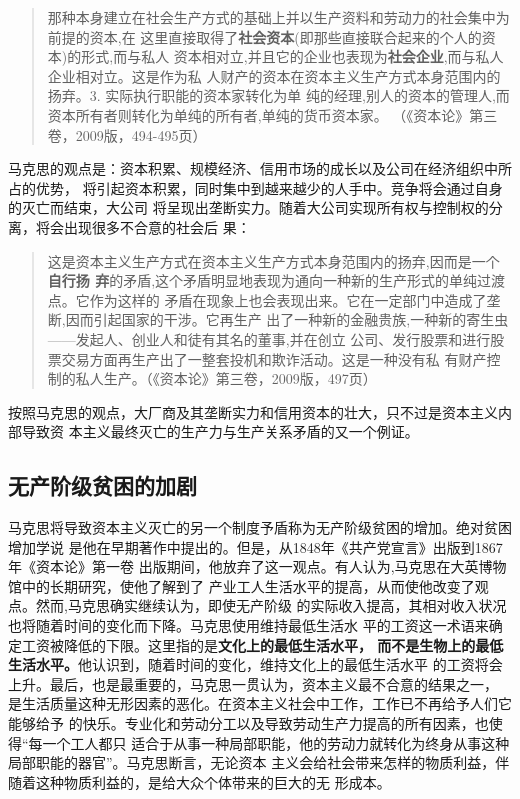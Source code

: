 \begin{quotation}
  那种本身建立在社会生产方式的基础上并以生产资料和劳动力的社会集中为前提的资本,在
  这里直接取得了\textbf{社会资本}(即那些直接联合起来的个人的资本)的形式,而与私人
  资本相对立,并且它的企业也表现为\textbf{社会企业},而与私人企业相对立。这是作为私
  人财产的资本在资本主义生产方式本身范围内的扬弃。3. 实际执行职能的资本家转化为单
  纯的经理,别人的资本的管理人,而资本所有者则转化为单纯的所有者,单纯的货币资本家。
  （《资本论》第三卷，2009版，494-495页）
\end{quotation}

马克思的观点是：资本积累、规模经济、信用市场的成长以及公司在经济组织中所占的优势，
将引起资本积累，同时集中到越来越少的人手中。竞争将会通过自身的灭亡而结束，大公司
将呈现出垄断实力。随着大公司实现所有权与控制权的分离，将会出现很多不合意的社会后
果：

\begin{quotation}
  这是资本主义生产方式在资本主义生产方式本身范围内的扬弃,因而是一个\textbf{自行扬
    弃}的矛盾,这个矛盾明显地表现为通向一种新的生产形式的单纯过渡点。它作为这样的
  矛盾在现象上也会表现出来。它在一定部门中造成了垄断,因而引起国家的干涉。它再生产
  出了一种新的金融贵族,一种新的寄生虫——发起人、创业人和徒有其名的董事,并在创立
  公司、发行股票和进行股票交易方面再生产出了一整套投机和欺诈活动。这是一种没有私
  有财产控制的私人生产。（《资本论》第三卷，2009版，497页）
\end{quotation}

按照马克思的观点，大厂商及其垄断实力和信用资本的壮大，只不过是资本主义内部导致资
本主义最终灭亡的生产力与生产关系矛盾的又一个例证。

\subsection{无产阶级贫困的加剧}

马克思将导致资本主义灭亡的另一个制度予盾称为无产阶级贫困的增加。绝对贫困增加学说
是他在早期著作中提出的。但是，从1848年《共产党宣言》出版到1867年《资本论》第一卷
出版期间，他放弃了这一观点。有人认为,马克思在大英博物馆中的长期研究，使他了解到了
产业工人生活水平的提高，从而使他改变了观点。然而,马克思确实继续认为，即使无产阶级
的实际收入提高，其相对收入状况也将随着时间的变化而下降。马克思使用维持最低生活水
平的工资这一术语来确定工资被降低的下限。这里指的是\textbf{文化上的最低生活水平，
  而不是生物上的最低生活水平。}他认识到，随着时间的变化，维持文化上的最低生活水平
的工资将会上升。最后，也是最重要的，马克思一贯认为，资本主义最不合意的结果之一，
是生活质量这种无形因素的恶化。在资本主义社会中工作，工作已不再给予人们它能够给予
的快乐。专业化和劳动分工以及导致劳动生产力提高的所有因素，也使得“每一个工人都只
适合于从事一种局部职能，他的劳动力就转化为终身从事这种局部职能的器官”。马克思断言，无论资本
主义会给社会带来怎样的物质利益，伴随着这种物质利益的，是给大众个体带来的巨大的无
形成本。

